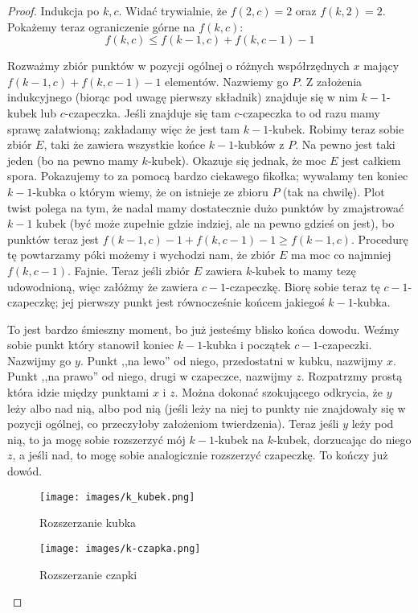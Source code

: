   \begin{proof}
    Indukcja po $k,c$. Widać trywialnie, że  $f(2,c) = 2$ oraz $f(k,2) = 2$. Pokażemy teraz ograniczenie górne na $f(k,c)$: \begin{equation*}
        f(k,c) \leq f(k-1,c) + f(k, c-1) - 1
    \end{equation*} 

    Rozważmy zbiór punktów w pozycji ogólnej o różnych współrzędnych $x$ mający $ f(k-1,c) + f(k, c-1) - 1 $ elementów. Nazwiemy go $P$. Z założenia indukcyjnego (biorąc pod uwagę pierwszy składnik) znajduje się w nim $k-1$-kubek lub $c$-czapeczka. Jeśli znajduje się tam $c$-czapeczka to od razu mamy sprawę załatwioną; zakładamy więc że jest tam $k-1$-kubek. Robimy teraz sobie zbiór $E$, taki że zawiera wszystkie końce $k-1$-kubków z $P$. Na pewno jest taki jeden (bo na pewno mamy $k$-kubek). Okazuje się jednak, że moc $E$ jest całkiem spora. Pokazujemy to za pomocą bardzo ciekawego fikołka; wywalamy ten koniec $k-1$-kubka o którym wiemy, że on istnieje ze zbioru $P$ (tak na chwilę). Plot twist polega na tym, że nadal mamy dostatecznie dużo punktów by zmajstrować $k-1$ kubek (być może zupełnie gdzie indziej, ale na pewno gdzieś on jest), bo punktów teraz jest $f(k-1,c) - 1 + f(k, c-1) - 1 \geq f(k-1,c)$. Procedurę tę powtarzamy póki możemy i wychodzi nam, że zbiór $E$ ma moc co najmniej $f(k,c-1)$. Fajnie. Teraz jeśli zbiór $E$ zawiera $k$-kubek to mamy tezę udowodnioną, więc załóżmy że zawiera $c-1$-czapeczkę. Biorę sobie teraz tę $c-1$-czapeczkę; jej pierwszy punkt jest równocześnie końcem jakiegoś $k-1$-kubka.
    
    To jest bardzo śmieszny moment, bo już jesteśmy blisko końca dowodu. Weźmy sobie punkt który stanowił koniec $k-1$-kubka i początek $c-1$-czapeczki. Nazwijmy go $y$. Punkt ,,na lewo'' od niego, przedostatni w kubku, nazwijmy $x$. Punkt ,,na prawo'' od niego, drugi w czapeczce, nazwijmy $z$. Rozpatrzmy prostą która idzie między punktami $x$ i $z$. Można dokonać szokującego odkrycia, że $y$ leży albo nad nią, albo pod nią (jeśli leży na niej to punkty nie znajdowały się w pozycji ogólnej, co przeczyłoby założeniom twierdzenia). Teraz jeśli $y$ leży pod nią, to ja mogę sobie rozszerzyć mój $k-1$-kubek na $k$-kubek, dorzucając do niego $z$, a jeśli nad, to mogę sobie analogicznie rozszerzyć czapeczkę. To kończy już dowód. 

    \begin{figure}[H]
        \centering
        \texttt{[image: images/k\_kubek.png]}
        \caption{Rozszerzanie kubka}
    \end{figure}

    
    \begin{figure}[H]
        \centering
        \texttt{[image: images/k-czapka.png]}
        \caption{Rozszerzanie czapki}
    \end{figure}
    
  \end{proof}